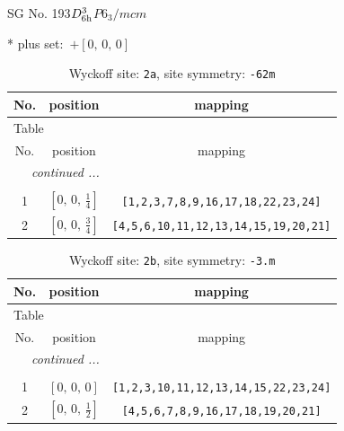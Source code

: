 \documentclass[fleqn,8pt]{jsarticle}
\begin{document}
\setcounter{MaxMatrixCols}{32}

\renewcommand{\tablename}{Table~}
\renewcommand{\figurename}{Figure~}
\begin{center}
\LARGE
SG No. 193\quad$D_{\rm 6h}^{3}$\quad$P6_3/mcm$\quad[ hexagonal ]
\end{center}
* plus set:\,\,\,$+\left[ 0,\, 0,\, 0 \right]$
\renewcommand{\arraystretch}{1.2}
\begin{longtable}{ccc}
\caption{Wyckoff site: {\tt 2a}, site symmetry: {\tt -62m}}
 \\
 \hline \hline
No. & position & mapping \\ \hline \endfirsthead

\multicolumn{2}{l}{\tablename\ \thetable{}} \\
 \hline \hline
No. & position & mapping \\ \hline \endhead

 \hline \hline
\multicolumn{2}{r}{\footnotesize\it continued ...} \\ \endfoot

 \hline \hline
\multicolumn{2}{r}{} \\ \endlastfoot

1 & $\left[ 0,\, 0,\, \frac{1}{4} \right]$ & {\tt [1,2,3,7,8,9,16,17,18,22,23,24]} \\ \hline
2 & $\left[ 0,\, 0,\, \frac{3}{4} \right]$ & {\tt [4,5,6,10,11,12,13,14,15,19,20,21]} \\
\end{longtable}
\renewcommand{\arraystretch}{1.2}
\begin{longtable}{ccc}
\caption{Wyckoff site: {\tt 2b}, site symmetry: {\tt -3.m}}
 \\
 \hline \hline
No. & position & mapping \\ \hline \endfirsthead

\multicolumn{2}{l}{\tablename\ \thetable{}} \\
 \hline \hline
No. & position & mapping \\ \hline \endhead

 \hline \hline
\multicolumn{2}{r}{\footnotesize\it continued ...} \\ \endfoot

 \hline \hline
\multicolumn{2}{r}{} \\ \endlastfoot

1 & $\left[ 0,\, 0,\, 0 \right]$ & {\tt [1,2,3,10,11,12,13,14,15,22,23,24]} \\ \hline
2 & $\left[ 0,\, 0,\, \frac{1}{2} \right]$ & {\tt [4,5,6,7,8,9,16,17,18,19,20,21]} \\
\end{longtable}
\end{document}
